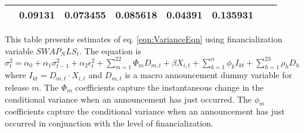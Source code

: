 \begin{sidewaystable}
{\begin{tabular}{@{}lllllllllllll@{}}
                          & \multicolumn{2}{c}{ 0.09131 }                                                 & \multicolumn{2}{c}{ 0.073455 }                                                 & \multicolumn{2}{c}{ 0.085618 }                                                 & \multicolumn{2}{c}{ 0.04391 }                                                   & \multicolumn{2}{c}{ 0.135931 }                                                 \\ \bottomrule 
\end{tabular}
}
\begin{tablenotes}\item 
        \singlespacing
        \footnotesize
        This table presents estimates of eq. \ref{eqn:VarianceEqn} using financialization variable $SWAP_NLS_t$. The equation is $\sigma_{t}^2=\alpha_0+\alpha_1 \sigma_{t-1}^2+\alpha_2 \epsilon_t^2 +\sum_{m=1}^{22} \Phi_m D_{m,t}+\beta X_{i,t}+\sum_{k=1}^n \phi_k I_{kt} + \sum_{h=1}^{23} \rho_h D_h$ where $I_{kt}=D_{m,t} \cdot X_{i,t}$ and $D_{m,t}$ is a macro announcement dummy variable for release $m$. The $\Phi_m$ coefficients capture the instantaneous change in the conditional variance when an announcement has just occurred. The $\phi_m$ coefficients capture the conditional variance when an announcement has just occurred in conjunction with the level of financialization.
\end{tablenotes}
\end{sidewaystable}


